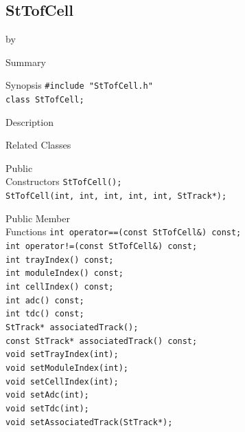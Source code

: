 \documentclass[twoside]{article}
\newcommand{\entrylabel}[1]{\mbox{\textbf{{#1}}}\hfil}%
\newenvironment{entry}
{\begin{list}{}%
    {\renewcommand{\makelabel}{\entrylabel}%
     \setlength{\labelwidth}{90pt}%
     \setlength{\leftmargin}{\labelwidth}
     \advance\leftmargin by \labelsep%
      }%
    }%
  {\end{list}}
\newcommand{\Entrylabel}[1]%
{\raisebox{0pt}[1ex][0pt]{\makebox[\labelwidth][l]%
    {\parbox[t]{\labelwidth}{\hspace{0pt}\textbf{{#1}}}}}}
\newenvironment{Entry}%
{\renewcommand{\entrylabel}{\Entrylabel}\begin{entry}}%
  {\end{entry}}
\begin{document}
\subsection{StTofCell}
\label{sec:StTofCell}
\begin{Entry}
\item[Summary]
\item[Synopsis]
    \verb+#include "StTofCell.h"+\\
    \verb+class StTofCell;+\\
\item[Description]
\item[Related Classes]
\item[Public\\ Constructors]
    \verb+StTofCell();+\\
    \verb+StTofCell(int, int, int, int, int, StTrack*);+\\
\item[Public Member\\ Functions]
    \verb+int operator==(const StTofCell&) const;+\\
    \verb+int operator!=(const StTofCell&) const;+\\
    \verb+int trayIndex() const;+\\
    \verb+int moduleIndex() const;+\\
    \verb+int cellIndex() const;+\\
    \verb+int adc() const;+\\
    \verb+int tdc() const;+\\
    \verb+StTrack* associatedTrack();+\\
    \verb+const StTrack* associatedTrack() const;+\\
    \verb+void setTrayIndex(int);+\\
    \verb+void setModuleIndex(int);+\\
    \verb+void setCellIndex(int);+\\
    \verb+void setAdc(int);+\\
    \verb+void setTdc(int);+\\
    \verb+void setAssociatedTrack(StTrack*);+\\
\end{Entry}
\clearpage
\end{document}
